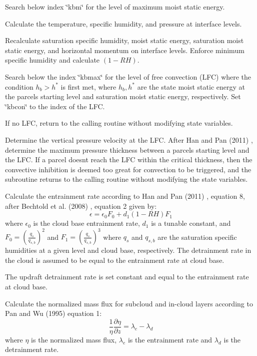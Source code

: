 \begin{DoxyItemize}
\item Search below index \char`\"{}kbm\char`\"{} for the level of maximum moist static energy.
\item Calculate the temperature, specific humidity, and pressure at interface levels.
\item Recalculate saturation specific humidity, moist static energy, saturation moist static energy, and horizontal momentum on interface levels. Enforce minimum specific humidity and calculate $(1 - RH)$.
\item Search below the index \char`\"{}kbmax\char`\"{} for the level of free convection (L\+FC) where the condition $h_b > h^*$ is first met, where $h_b, h^*$ are the state moist static energy at the parcel\textquotesingle{}s starting level and saturation moist static energy, respectively. Set \char`\"{}kbcon\char`\"{} to the index of the L\+FC.
\item If no L\+FC, return to the calling routine without modifying state variables.
\item Determine the vertical pressure velocity at the L\+FC. After Han and Pan (2011) \cite{han_and_pan_2011} , determine the maximum pressure thickness between a parcel\textquotesingle{}s starting level and the L\+FC. If a parcel doesn\textquotesingle{}t reach the L\+FC within the critical thickness, then the convective inhibition is deemed too great for convection to be triggered, and the subroutine returns to the calling routine without modifying the state variables.
\item Calculate the entrainment rate according to Han and Pan (2011) \cite{han_and_pan_2011} , equation 8, after Bechtold et al. (2008) \cite{bechtold_et_al_2008}, equation 2 given by\+: \[ \epsilon = \epsilon_0F_0 + d_1\left(1-RH\right)F_1 \] where $\epsilon_0$ is the cloud base entrainment rate, $d_1$ is a tunable constant, and $F_0=\left(\frac{q_s}{q_{s,b}}\right)^2$ and $F_1=\left(\frac{q_s}{q_{s,b}}\right)^3$ where $q_s$ and $q_{s,b}$ are the saturation specific humidities at a given level and cloud base, respectively. The detrainment rate in the cloud is assumed to be equal to the entrainment rate at cloud base.
\item The updraft detrainment rate is set constant and equal to the entrainment rate at cloud base.
\item Calculate the normalized mass flux for subcloud and in-\/cloud layers according to Pan and Wu (1995) \cite{pan_and_wu_1995} equation 1\+: \[ \frac{1}{\eta}\frac{\partial \eta}{\partial z} = \lambda_e - \lambda_d \] where $\eta$ is the normalized mass flux, $\lambda_e$ is the entrainment rate and $\lambda_d$ is the detrainment rate.

\end{DoxyItemize}
